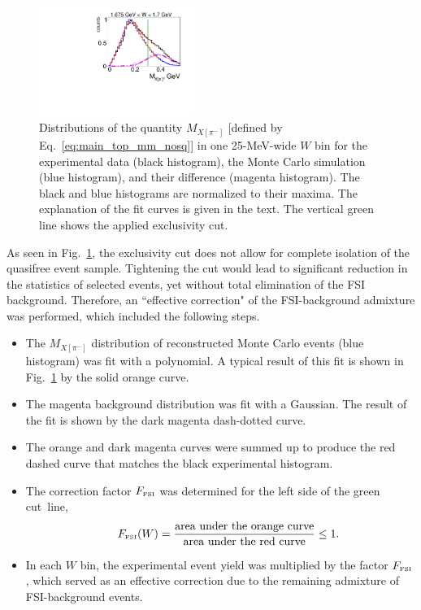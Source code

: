 \documentclass[prc,twocolumn,superscriptaddress,showpacs,amssymb,amsmath,amsfonts,aps,nofootinbib]{revtex4-1}
\begin{document}
\begin{figure}[htp]
\begin{center}
\includegraphics[width=0.45\textwidth,keepaspectratio]{pictures/event_selection/excl_cut_pim_miss2.pdf}
\caption{Distributions of the quantity $M_{X[\pi^{-}]}$ [defined by Eq.\!~\eqref{eq:main_top_mm_nosq}] in one 25-MeV-wide $W$ bin for the experimental data (black histogram), the Monte Carlo simulation (blue histogram), and their difference (magenta histogram). The black and blue histograms are normalized to their maxima. The explanation of the fit curves is given in the text. The vertical green line shows the applied exclusivity cut.}
\label{fig:pim_miss_top_cut}
\end{center}
\end{figure}


As seen in Fig.\!~\ref{fig:pim_miss_top_cut}, the exclusivity cut does not allow for complete isolation of the quasifree event sample. Tightening the cut would lead to significant reduction in the statistics of selected events, yet without total elimination of the FSI background. Therefore, an ``effective correction" of the FSI-background admixture was performed, which included the following steps.


\begin{itemize}
\item The $M_{X[\pi^{-}]}$ distribution of reconstructed Monte Carlo events (blue histogram) was fit with a polynomial. A typical result of this fit is shown in Fig.\!~\ref{fig:pim_miss_top_cut} by the solid orange curve.
\item The magenta background distribution was fit with a Gaussian. The result of the fit is shown by the dark magenta dash-dotted curve.
\item The orange and dark magenta curves were summed up to produce the red dashed curve that matches the black experimental histogram.
\item The correction factor $F_{\text{\tiny FSI}}$ was determined for the left side of the green cut~line,
\begin{equation}
\begin{aligned}
~~~~F_{\text{\tiny FSI}}(W) = \frac{\text{area~under~the~orange~curve}}{\text{area~under~the~red~curve}} \leq 1.\label{eq:fsi_corr_fact}
\end{aligned}
\end{equation}
\item In each $W$ bin, the experimental event yield was multiplied by the factor $F_{\text{\tiny FSI}}$, which served as an effective correction due to the remaining admixture of FSI-background events.
\end{itemize}
\end{document}
